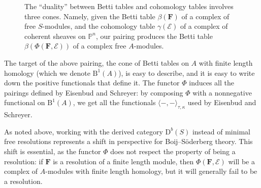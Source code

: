 \documentclass[12pt]{amsart}
\theoremstyle{definition}
\theoremstyle{remark}
\newcommand{\PP}{\mathbb{P}}
\newcommand{\cE}{\mathcal{E}}
\newcommand{\FF}{\mathbf{F}}
\newcommand{\DD}{\mathrm{D}}
\newcommand{\CQ}{\mathrm{C}}
\newcommand{\BBQ}{\mathrm{B}}
\begin{document}
\begin{figure}
\caption{The ``duality'' between Betti tables and cohomology tables involves three cones.  Namely, given the Betti table $\beta(\FF)$ of a complex of free $S$-modules, and the cohomology table $\gamma(\cE)$ of a complex of coherent sheaves on $\PP^n$, our pairing produces the Betti table $\beta(\Phi(\FF,\cE))$ of a complex free $A$-modules.
}
\label{fig:bracket}
\end{figure}

The target of the above pairing, the cone of Betti tables on $A$ with finite length homology (which we denote $\BBQ^1(A)$), is easy to describe, and it is easy to write down the positive functionals that define it.
The functor $\Phi$ induces all the pairings defined by Eisenbud and Schreyer: by composing $\Phi$ with a nonnegative functional on $\BBQ^1(A)$, we get all the functionals $\langle -,-\rangle_{\tau,\kappa}$ used by Eisenbud and Schreyer.

As noted above, working with the derived category $\DD^b(S)$ instead of minimal free resolutions represents a shift in perspective for Boij--S\"oderberg theory.  This shift is essential, as the functor $\Phi$ does not respect the property of being a resolution: if $\FF$ is a resolution of a finite length module, then $\Phi(\FF,\cE)$ will be a complex of $A$-modules with finite length homology, but it will generally fail to be a resolution.  
\end{document}
